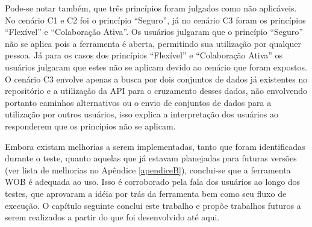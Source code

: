Pode-se notar também, que três princípios foram julgados como não aplicáveis. No cenário 
C1 e C2 foi o princípio “Seguro”, já no cenário C3 foram os princípios “Flexível” e 
“Colaboração Ativa”. Os usuários julgaram que o princípio “Seguro” não se aplica pois a 
ferramenta é aberta, permitindo sua utilização por qualquer pessoa. Já para os casos dos 
princípios “Flexível” e “Colaboração Ativa” os usuários julgaram que estes não se aplicam 
devido ao cenário que foram expostos. O cenário C3 envolve apenas a busca por dois 
conjuntos de dados já existentes no repositório e a utilização da API para o cruzamento 
desses dados, não envolvendo portanto caminhos alternativos ou o envio de conjuntos de 
dados para a utilização por outros usuários, isso explica a interpretação dos usuários 
ao responderem que os princípios não se aplicam.

Embora existam melhorias a serem implementadas, tanto que foram identificadas durante o 
teste, quanto aquelas que já estavam planejadas para futuras versões (ver lista de 
melhorias no Apêndice \ref{apendiceB}), conclui-se que a ferramenta WOB é adequada ao uso. Isso é 
corroborado pela fala dos usuários ao longo dos testes, que aprovaram a idéia por trás da 
ferramenta bem como seu fluxo de execução. O capítulo seguinte conclui este trabalho e 
propõe trabalhos futuros a serem realizados a partir do que foi desenvolvido até aqui.

